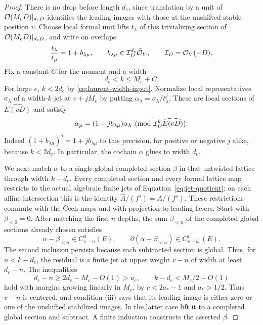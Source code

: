 \begin{proof}
There is no drop before length $d_e$, since translation by a unit
of $\mathcal O(M_eD)|_{d_eD}$ identifies the leading images with those
at the unshifted stable position $v$.
Choose local formal unit lifts $t_\lambda$ of this trivializing
section of $\mathcal O(M_eD)|_{d_eD}$, and write on overlaps
\[
 \frac{t_\lambda}{t_\mu}=1+b_{\lambda\mu},
 \qquad b_{\lambda\mu}\in\mathcal I_D^{d_e}\widehat{\mathcal O}_V,
 \qquad \mathcal I_D=\mathcal O_V(-D).
\]
Fix a constant $C$ for the moment and a width
\[
 d_e<k\le M_e+C.
\]
For large $e$, $k<2d_e$ by \eqref{eq:laurent-width-input}.
Normalize local representatives $\sigma_\lambda$ of a width-$k$
jet at $v+jM_e$ by putting
$\alpha_\lambda=\sigma_\lambda/t_\lambda^j$.
These are local sections of $\widehat{E(vD)}$ and satisfy
\begin{equation}\label{eq:normalized-jet-overlap}
 \alpha_\mu=(1+jb_{\lambda\mu})\alpha_\lambda
 \pmod{\mathcal I_D^k\widehat{E(vD)}}.
\end{equation}
Indeed $(1+b_{\lambda\mu})^j=1+jb_{\lambda\mu}$ to this
precision, for positive or negative $j$ alike, because $k<2d_e$.
In particular, the cochain $\alpha$ glues to width $d_e$.

We next match $\alpha$ to a single global completed section $\beta$
in that untwisted lattice through width $k-d_e$.
Every completed section and every formal lattice map restricts to the
actual algebraic finite jets of Equation~\eqref{eq:jet-quotient}:
on each affine intersection this is the identity
$\widehat A/(f^s)=A/(f^s)$.  These restrictions commute with the
\v Cech maps and with projection to leading layers.
Start with $\beta_{<0}=0$.  After matching the first $n$ depths,
the sum $\beta_{<n}$ of the completed global sections already chosen
satisfies
\[
 \alpha-\beta_{<n}\in C_{v-n}^0(E),\qquad
 \partial(\alpha-\beta_{<n})\in C_{v-d_e}^1(E).
\]
The second inclusion persists because each subtracted section is
global.  Thus, for $n<k-d_e$, the residual is a finite jet at upper
weight $v-n$ of width at least $d_e-n$.  The inequalities
\begin{equation}\label{eq:matching-margin}
 d_e-n\ge 2d_e-M_e-O(1)>u_e,
 \qquad k-d_e<M_e/2-O(1)
\end{equation}
hold with margins growing linearly in $M_e$, by $c<2a_*-1$ and
$a_*>1/2$.  Thus $v-n$ is centered, and condition (iii) says that
its leading image is either zero or one of the unshifted stabilized
images.  In the latter case lift it to a completed global section
and subtract.  A finite induction constructs the asserted $\beta$.


\end{proof}
